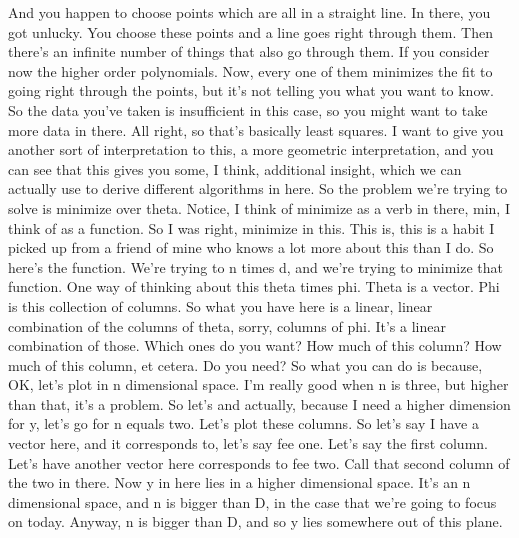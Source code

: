 \documentclass[11pt,a4paper]{article}
\begin{document}
And you happen to choose points which are all in a straight line. In there, you got unlucky. You choose these points and a line goes right through them. Then there's an infinite number of things that also go through them. If you consider now the higher order polynomials. Now, every one of them minimizes the fit to going right through the points, but it's not telling you what you want to know. So the data you've taken is insufficient in this case, so you might want to take more data in there. All right, so that's basically least squares. I want to give you another sort of interpretation to this, a more geometric interpretation, and you can see that this gives you some, I think, additional insight, which we can actually use to derive different algorithms in here. So the problem we're trying to solve is minimize over theta. Notice, I think of minimize as a verb in there, min, I think of as a function. So I was right, minimize in this. This is, this is a habit I picked up from a friend of mine who knows a lot more about this than I do. So here's the function. We're trying to n times d, and we're trying to minimize that function. One way of thinking about this theta times phi. Theta is a vector. Phi is this collection of columns. So what you have here is a linear, linear combination of the columns of theta, sorry, columns of phi. It's a linear combination of those. Which ones do you want? How much of this column? How much of this column, et cetera. Do you need? So what you can do is because, OK, let's plot in n dimensional space. I'm really good when n is three, but higher than that, it's a problem. So let's and actually, because I need a higher dimension for y, let's go for n equals two. Let's plot these columns. So let's say I have a vector here, and it corresponds to, let's say fee one. Let's say the first column. Let's have another vector here corresponds to fee two. Call that second column of the two in there. Now y in here lies in a higher dimensional space. It's an n dimensional space, and n is bigger than D, in the case that we're going to focus on today. Anyway, n is bigger than D, and so y lies somewhere out of this plane.
\end{document}
